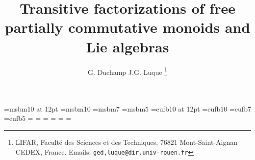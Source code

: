 \textwidth 140mm
\textheight 240mm
\topmargin -20mm

\font\twelvesym=msbm10 at 12pt
\font\tensym=msbm10
\font\sevensym=msbm7
\font\fivesym=msbm5
\font\twelvegoth=eufb10 at 12pt
\font\tengoth=eufb10
\font\sevengoth=eufb7
\font\fivegoth=eufb5
\newfam\symfam
\textfont\symfam=\tensym
\scriptfont\symfam=\sevensym
\scriptscriptfont\symfam=\fivesym
\def\sym{\fam\symfam\tensym}
\newfam\gothfam
\textfont\gothfam=\tengoth
\scriptfont\gothfam=\sevengoth
\scriptscriptfont\gothfam=\fivegoth
\def\goth{\fam\gothfam\tengoth}
\setcounter{section}{0}
\newtheorem{theorem}{Theorem}
\newtheorem{proposition}[theorem]{Proposition}
\newtheorem{lemma}[theorem]{Lemma}
\newtheorem{corollary}[theorem]{Corollary}
\newtheorem{definition}[theorem]{Definition}
\newtheorem{note}{Note}
\newtheorem{remark}[note]{Remark}
\newtheorem{algorithm}{Algorithm}
\newtheorem{example}{Example}
\def\Preuve{\medskip\noindent {\it Preuve --- \ }}
\def\cqfd{\hfill \\ \hbox{ }\hfill$\Box$ \bigskip}
\def\shuf{\sqcup\!\!\sqcup}
\def\bb{\sym}
\def\B{{\sym B}}
\def\Q{{\sym Q}}
\def\Z{{\sym Z}}
\def\M{{\sym M}}
\def\F{{\sym F}}
\def\Ma{{\goth M}}
\def\GG{{\sym G}}
\def\L{{\sym L}}
\def\OV#1{\overline{#1}}
\def\bs{$\backslash$}
\def\G{\Gamma}
\def\g{\gamma}
\def\S{\Gamma^{(1)}}
\def\H{{\goth H}}
\def\ep{\epsilon}
\def\al{\alpha}
\def\A{{\bb A}}
\def\C{{\bb C}}
\def\R{{\bb R}}
\def\N{{\bb N}}
\def\bx{\bar x}
\def\nat{{\tt nat}}
\def\s{s}
\def\CQFD{\\ \hbox{ }\hfill$\Box$}
\def\preceq{\underline{\prec}}
\def\Alph{\mbox{Alph}}
\title{{\bf Transitive factorizations of free partially
commutative monoids and Lie algebras}}
\author{G. {\sc Duchamp} J.G. {\sc Luque}
\thanks{LIFAR, Facult\'e des Sciences et des Techniques,
76821 Mont-Saint-Aignan CEDEX,
France. Emails: {\tt ged,luque@dir.univ-rouen.fr}}}


